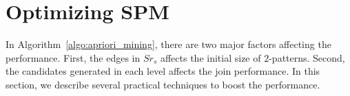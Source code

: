 \section{Optimizing SPM}
\label{sec:opt}
In Algorithm~\ref{algo:apriori_mining}, there are
 two major factors affecting the performance.
First, the edges in $Sr_s$ affects the initial 
size of $2$-patterns. Second, the candidates generated in each 
level affects the join performance.
In this section, we describe several practical 
techniques to boost the performance.
%
%

